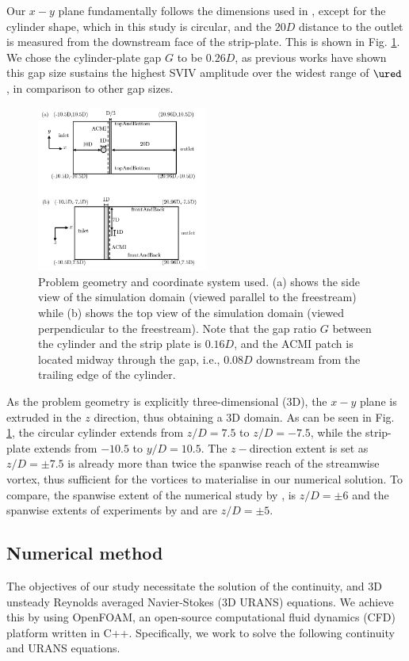 \documentclass[a4paper,fleqn]{cas-sc}
\begin{document}
Our $x-y$ plane fundamentally follows the dimensions used in \citet{Maruai2017,Maruai2018}, except for the cylinder shape, which in this study is circular, and the $20D$ distance to the outlet is measured from the downstream face of the strip-plate. This is shown in Fig. \ref{fig:problemGeometry}. We chose the cylinder-plate gap $G$ to be $0.26D$, as previous works have shown this gap size sustains the highest SVIV amplitude over the widest range of $\ured$, in comparison to other gap sizes.

\begin{figure}
  \centering
  \includegraphics[width=0.5\textwidth]{figs/figure2}
  \caption{Problem geometry and coordinate system used. (a) shows the side view of the simulation domain (viewed parallel to the freestream) while (b) shows the top view of the simulation domain (viewed perpendicular to the freestream). Note that the gap ratio $G$ between the cylinder and the strip plate is $0.16D$, and the ACMI patch is located midway through the gap, i.e., $0.08D$ downstream from the trailing edge of the cylinder.}
  \label{fig:problemGeometry}
\end{figure}

As the problem geometry is explicitly three-dimensional (3D), the $x-y$ plane is extruded in the $z$ direction, thus obtaining a 3D domain. As can be seen in Fig. \ref{fig:problemGeometry}, the circular cylinder extends from $z/D=7.5$ to $z/D=-7.5$, while the strip-plate extends from $-10.5$ to $y/D=10.5$. The $z-$direction extent is set as $z/D=\pm7.5$ is already more than twice the spanwise reach of the streamwise vortex, thus sufficient for the vortices to materialise in our numerical solution. To compare, the spanwise extent of the numerical study by \citet{Deng2007}, is $z/D=\pm6$ and the spanwise extents of experiments by \citet{Nguyen2012} and \citet{Koide2013} are $z/D=\pm5$.

\subsection{Numerical method} \label{ssec:numMeth}
The objectives of our study necessitate the solution of the continuity, and 3D unsteady Reynolds averaged Navier-Stokes (3D URANS) equations. We achieve this by using OpenFOAM, an open-source computational fluid dynamics (CFD) platform written in C++. Specifically, we work to solve the following continuity and URANS equations.
\end{document}
